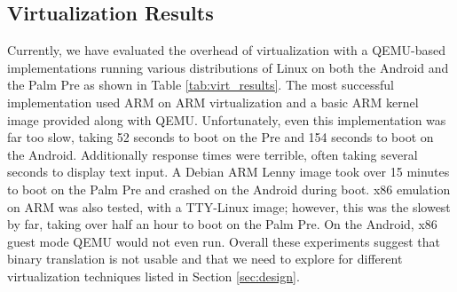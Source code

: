 \subsection{Virtualization Results}

Currently, we have evaluated the overhead of virtualization with a QEMU-based implementations running various distributions of Linux on both the Android and the Palm Pre as shown in Table \ref{tab:virt_results}. The most successful implementation used ARM on ARM virtualization and a basic ARM kernel image provided along with QEMU. Unfortunately, even this implementation was far too slow, taking 52 seconds to boot on the Pre and 154 seconds to boot on the Android. Additionally response times were terrible, often taking several seconds to display text input. A Debian ARM Lenny image took over 15 minutes to boot on the Palm Pre and crashed on the Android during boot. x86 emulation on ARM was also tested, with a TTY-Linux image; however, this was the slowest by far, taking over half an hour to boot on the Palm Pre. On the Android, x86 guest mode QEMU would not even run. Overall these experiments suggest that binary translation is not usable and that we need to explore for different virtualization techniques listed in Section \ref{sec:design}.


